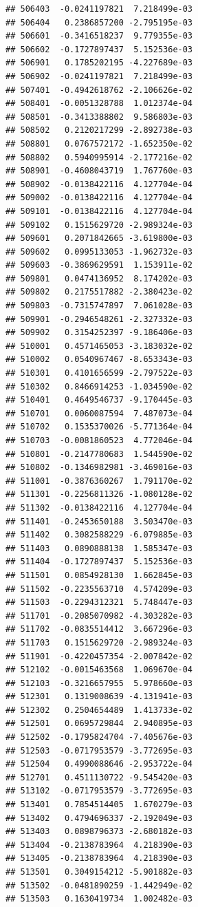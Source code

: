 \begin{frame}[fragile]
\begin{verbatim}
## 506403  -0.0241197821  7.218499e-03
## 506404   0.2386857200 -2.795195e-03
## 506601  -0.3416518237  9.779355e-03
## 506602  -0.1727897437  5.152536e-03
## 506901   0.1785202195 -4.227689e-03
## 506902  -0.0241197821  7.218499e-03
## 507401  -0.4942618762 -2.106626e-02
## 508401  -0.0051328788  1.012374e-04
## 508501  -0.3413388802  9.586803e-03
## 508502   0.2120217299 -2.892738e-03
## 508801   0.0767572172 -1.652350e-02
## 508802   0.5940995914 -2.177216e-02
## 508901  -0.4608043719  1.767760e-03
## 508902  -0.0138422116  4.127704e-04
## 509002  -0.0138422116  4.127704e-04
## 509101  -0.0138422116  4.127704e-04
## 509102   0.1515629720 -2.989324e-03
## 509601   0.2071842665 -3.619800e-03
## 509602   0.0995133053 -1.962732e-03
## 509603  -0.3869629591  1.153911e-02
## 509801   0.0474136952  8.174202e-03
## 509802   0.2175517882 -2.380423e-02
## 509803  -0.7315747897  7.061028e-03
## 509901  -0.2946548261 -2.327332e-03
## 509902   0.3154252397 -9.186406e-03
## 510001   0.4571465053 -3.183032e-02
## 510002   0.0540967467 -8.653343e-03
## 510301   0.4101656599 -2.797522e-03
## 510302   0.8466914253 -1.034590e-02
## 510401   0.4649546737 -9.170445e-03
## 510701   0.0060087594  7.487073e-04
## 510702   0.1535370026 -5.771364e-04
## 510703  -0.0081860523  4.772046e-04
## 510801  -0.2147780683  1.544590e-02
## 510802  -0.1346982981 -3.469016e-03
## 511001  -0.3876360267  1.791170e-02
## 511301  -0.2256811326 -1.080128e-02
## 511302  -0.0138422116  4.127704e-04
## 511401  -0.2453650188  3.503470e-03
## 511402   0.3082588229 -6.079885e-03
## 511403   0.0890888138  1.585347e-03
## 511404  -0.1727897437  5.152536e-03
## 511501   0.0854928130  1.662845e-03
## 511502  -0.2235563710  4.574209e-03
## 511503  -0.2294312321  5.748447e-03
## 511701  -0.2085070982 -4.303282e-03
## 511702  -0.0835514412  3.667296e-03
## 511703   0.1515629720 -2.989324e-03
## 511901  -0.4220457354 -2.007842e-02
## 512102  -0.0015463568  1.069670e-04
## 512103  -0.3216657955  5.978660e-03
## 512301   0.1319008639 -4.131941e-03
## 512302   0.2504654489  1.413733e-02
## 512501   0.0695729844  2.940895e-03
## 512502  -0.1795824704 -7.405676e-03
## 512503  -0.0717953579 -3.772695e-03
## 512504   0.4990088646 -2.953722e-04
## 512701   0.4511130722 -9.545420e-03
## 513102  -0.0717953579 -3.772695e-03
## 513401   0.7854514405  1.670279e-03
## 513402   0.4794696337 -2.192049e-03
## 513403   0.0898796373 -2.680182e-03
## 513404  -0.2138783964  4.218390e-03
## 513405  -0.2138783964  4.218390e-03
## 513501   0.3049154212 -5.901882e-03
## 513502  -0.0481890259 -1.442949e-02
## 513503   0.1630419734  1.002482e-03

\end{verbatim}
\end{frame}
